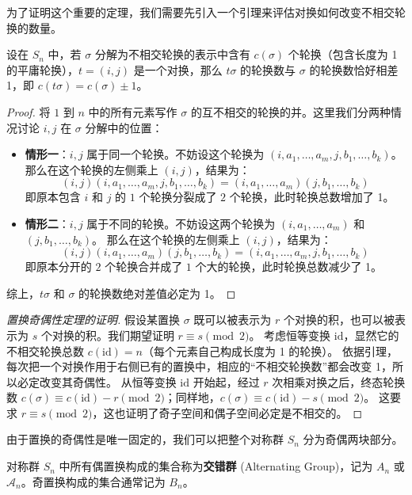 \documentclass[11pt]{article}
\begin{document}
为了证明这个重要的定理，我们需要先引入一个引理来评估对换如何改变不相交轮换的数量。
\begin{cnlemma}
    设在 $S_n$ 中，若 $\sigma$ 分解为不相交轮换的表示中含有 $c(\sigma)$ 个轮换（包含长度为 1 的平庸轮换），$t = (i, j)$ 是一个对换，那么 $t\sigma$ 的轮换数与 $\sigma$ 的轮换数恰好相差 1，即 $c(t\sigma) = c(\sigma) \pm 1$。
\end{cnlemma}
\begin{proof}
    将 $1$ 到 $n$ 中的所有元素写作 $\sigma$ 的互不相交的轮换的并。这里我们分两种情况讨论 $i, j$ 在 $\sigma$ 分解中的位置：
    \begin{itemize}
        \item \textbf{情形一}：$i, j$ 属于同一个轮换。不妨设这个轮换为 $(i, a_1, \dots, a_m, j, b_1, \dots, b_k)$。
        那么在这个轮换的左侧乘上 $(i, j)$，结果为：
        \[
            (i, j)(i, a_1, \dots, a_m, j, b_1, \dots, b_k) = (i, a_1, \dots, a_m)(j, b_1, \dots, b_k)
        \]
        即原本包含 $i$ 和 $j$ 的 $1$ 个轮换分裂成了 $2$ 个轮换，此时轮换总数增加了 1。
        \item \textbf{情形二}：$i, j$ 属于不同的轮换。不妨设这两个轮换为 $(i, a_1, \dots, a_m)$ 和 $(j, b_1, \dots, b_k)$。
        那么在这个轮换的左侧乘上 $(i, j)$，结果为：
        \[
            (i, j)(i, a_1, \dots, a_m)(j, b_1, \dots, b_k) = (i, a_1, \dots, a_m, j, b_1, \dots, b_k)
        \]
        即原本分开的 $2$ 个轮换合并成了 $1$ 个大的轮换，此时轮换总数减少了 1。
    \end{itemize}
    综上，$t\sigma$ 和 $\sigma$ 的轮换数绝对差值必定为 1。
\end{proof}

\begin{proof}[置换奇偶性定理的证明]
    假设某置换 $\sigma$ 既可以被表示为 $r$ 个对换的积，也可以被表示为 $s$ 个对换的积。我们期望证明 $r \equiv s \pmod 2$。
    考虑恒等变换 $\mathrm{id}$，显然它的不相交轮换总数 $c(\mathrm{id}) = n$（每个元素自己构成长度为 1 的轮换）。
    依据引理，每次把一个对换作用于右侧已有的置换中，相应的“不相交轮换数”都会改变 1，所以必定改变其奇偶性。
    从恒等变换 $\mathrm{id}$ 开始起，经过 $r$ 次相乘对换之后，终态轮换数 $c(\sigma) \equiv c(\mathrm{id}) - r \pmod 2$；同样地，$c(\sigma) \equiv c(\mathrm{id}) - s \pmod 2$。
    这要求 $r \equiv s \pmod 2$，这也证明了奇子空间和偶子空间必定是不相交的。
\end{proof}

由于置换的奇偶性是唯一固定的，我们可以把整个对称群 $S_n$ 分为奇偶两块部分。
\begin{cndefinition}[交错群]
    对称群 $S_n$ 中所有偶置换构成的集合称为\textbf{交错群} (Alternating Group)，记为 $A_n$ 或 $\mathcal{A}_n$。奇置换构成的集合通常记为 $B_n$。
\end{cndefinition}
\end{document}
